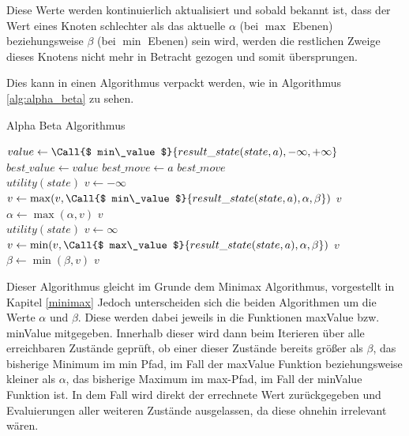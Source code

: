 Diese Werte werden kontinuierlich aktualisiert und sobald bekannt ist, dass der Wert eines Knoten schlechter als das aktuelle $\alpha$ (bei $\max$ Ebenen) beziehungsweise $\beta$ (bei $\min$ Ebenen) sein wird, werden die restlichen Zweige dieses Knotens nicht mehr in Betracht gezogen und somit übersprungen. \cite{Russell2010}

Dies kann in einen Algorithmus verpackt werden, wie in Algorithmus \ref{alg:alpha_beta} zu sehen.

\begin{algorithm}[p]
\caption{Alpha Beta Algorithmus \cite{Russell2010}}
\label{alg:alpha_beta}
\begin{algorithmic}
		\State $ value  \gets \Call{$ min\_value $}{ result\_state(state, a) , -\infty, +\infty}$
			\State $ best\_value  \gets  value $
			\State $ best\_move  \gets  a $
		\EndIf
	\EndFor
	\State \Return $ best\_move $
\EndFunction
\\
	 \State \Return $ utility(state) $ \EndIf
	\State $v \gets -\infty$
		\State $ v  \gets \max( v , \Call{$ min\_value $}{ result\_state(state, a) , \alpha, \beta})$
		 \State \Return $ v $ \EndIf
		\State $\alpha \gets \max(\alpha,  v )$
	\EndFor
	\State \Return $ v $
\EndFunction
\\
	 \State \Return $ utility(state) $ \EndIf
	\State $ v  \gets \infty$
		\State $ v  \gets \min( v , \Call{$ max\_value $}{ result\_state(state, a) , \alpha, \beta})$
		 \State \Return $v$ \EndIf
		\State $\beta \gets \min(\beta, v)$
	\EndFor
	\State \Return $v$
\EndFunction
\end{algorithmic}
\end{algorithm}

Dieser Algorithmus gleicht im Grunde dem Minimax Algorithmus, vorgestellt in Kapitel \ref{minimax} Jedoch unterscheiden sich die beiden Algorithmen um die Werte $\alpha$ und $\beta$. Diese werden dabei jeweils in die Funktionen maxValue bzw. minValue mitgegeben. Innerhalb dieser wird dann beim Iterieren über alle erreichbaren Zustände geprüft, ob einer dieser Zustände bereits größer als $\beta$, das bisherige Minimum im min Pfad, im Fall der maxValue Funktion beziehungsweise kleiner als $\alpha$, das bisherige Maximum im max-Pfad, im Fall der minValue Funktion ist. In dem Fall wird direkt der errechnete Wert zurückgegeben und Evaluierungen aller weiteren Zustände ausgelassen, da diese ohnehin irrelevant wären.


